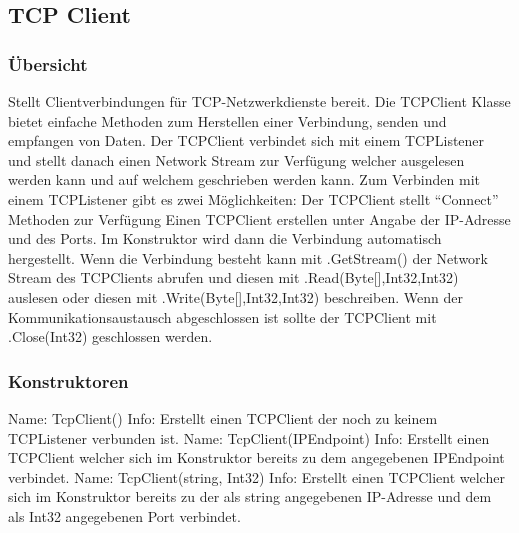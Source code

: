 \subsection{TCP Client}
\subsubsection{Übersicht}
Stellt Clientverbindungen für TCP-Netzwerkdienste bereit. Die TCPClient Klasse bietet einfache Methoden zum Herstellen einer Verbindung, senden und empfangen von Daten. Der TCPClient verbindet sich mit einem TCPListener und stellt danach einen Network Stream zur Verfügung welcher ausgelesen werden kann und auf welchem geschrieben werden kann. Zum Verbinden mit einem TCPListener gibt es zwei Möglichkeiten:
Der TCPClient stellt “Connect” Methoden zur Verfügung
Einen TCPClient erstellen unter Angabe der IP-Adresse und des Ports. Im Konstruktor wird dann die Verbindung automatisch hergestellt.
Wenn die Verbindung besteht kann mit .GetStream() der Network Stream des TCPClients abrufen und diesen mit .Read(Byte[],Int32,Int32) auslesen oder diesen mit .Write(Byte[],Int32,Int32) beschreiben. Wenn der Kommunikationsaustausch abgeschlossen ist sollte der TCPClient mit .Close(Int32) geschlossen werden.
\subsubsection{Konstruktoren}
Name: TcpClient()
\newline
Info: Erstellt einen TCPClient der noch zu keinem TCPListener verbunden ist.
\newline
\newline
Name: TcpClient(IPEndpoint)
\newline
Info: Erstellt einen TCPClient welcher sich im Konstruktor bereits zu dem angegebenen IPEndpoint verbindet.
\newline
\newline
Name: TcpClient(string, Int32)
\newline
Info: Erstellt einen TCPClient welcher sich im Konstruktor bereits zu der als string angegebenen IP-Adresse und dem als Int32 angegebenen Port verbindet.
